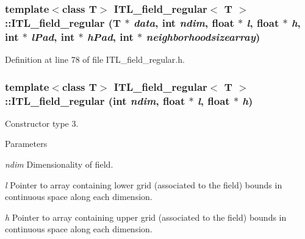 \hypertarget{classITL__field__regular_aab02e2d45e98a9e8f861c448c30a319c}{
\subsubsection[{ITL\_\-field\_\-regular}]{\setlength{\rightskip}{0pt plus 5cm}template$<$class T$>$ {\bf ITL\_\-field\_\-regular}$<$ T $>$::{\bf ITL\_\-field\_\-regular} (T $\ast$ {\em data}, \/  int {\em ndim}, \/  float $\ast$ {\em l}, \/  float $\ast$ {\em h}, \/  int $\ast$ {\em lPad}, \/  int $\ast$ {\em hPad}, \/  int $\ast$ {\em neighborhoodsizearray})}}
\label{classITL__field__regular_aab02e2d45e98a9e8f861c448c30a319c}


Definition at line 78 of file ITL\_\-field\_\-regular.h.

\hypertarget{classITL__field__regular_a4fb5a86290af1021054c96b1aed9d504}{
\subsubsection[{ITL\_\-field\_\-regular}]{\setlength{\rightskip}{0pt plus 5cm}template$<$class T$>$ {\bf ITL\_\-field\_\-regular}$<$ T $>$::{\bf ITL\_\-field\_\-regular} (int {\em ndim}, \/  float $\ast$ {\em l}, \/  float $\ast$ {\em h})}}
\label{classITL__field__regular_a4fb5a86290af1021054c96b1aed9d504}


Constructor type 3. 


\begin{DoxyParams}{Parameters}
\item[{\em ndim}]Dimensionality of field. \item[{\em l}]Pointer to array containing lower grid (associated to the field) bounds in continuous space along each dimension. \item[{\em h}]Pointer to array containing upper grid (associated to the field) bounds in continuous space along each dimension. \end{DoxyParams}


